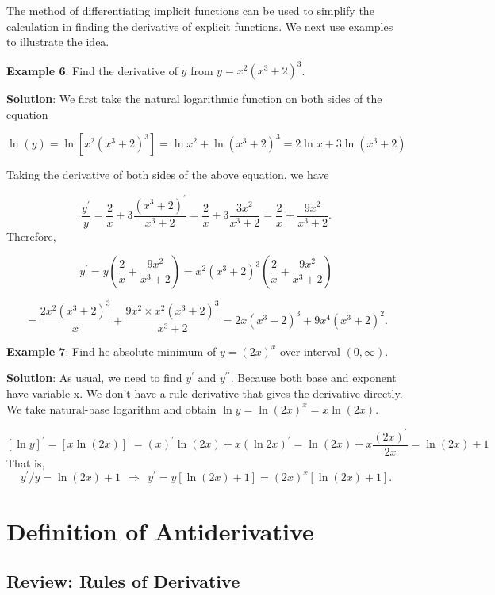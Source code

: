 \documentclass[
]{book}
\begin{document}
The method of differentiating implicit functions can be used to simplify the calculation in finding the derivative of explicit functions. We next use examples to illustrate the idea.

\hfill\break

\textbf{Example 6}: Find the derivative of \(y\) from \(y = x^2(x^3+2)^3\).

\textbf{Solution}: We first take the natural logarithmic function on both sides of the equation

\[
\ln (y) = \ln[x^2(x^3+2)^3] = \ln x^2 + \ln (x^3 + 2)^3 = 2\ln x + 3\ln  (x^3 + 2)
\]

Taking the derivative of both sides of the above equation, we have

\[
\frac{y^\prime}{y} = \frac{2}{x} + 3\frac{(x^3+2)^\prime}{x^3+2} = \frac{2}{x} + 3\frac{3x^2}{x^3+2} = \frac{2}{x} + \frac{9x^2}{x^3+2}.
\]
Therefore,

\[
y^\prime = y\left( \frac{2}{x} + \frac{9x^2}{x^3+2}\right) = x^2(x^3+2)^3 \left( \frac{2}{x} + \frac{9x^2}{x^3+2}\right) 
\]

\[
=  \frac{2x^2(x^3+2)^3}{x} + \frac{9x^2\times x^2(x^3+2)^3}{x^3+2}= 2x(x^3+2)^3 + 9x^4(x^3+2)^2.
\]

\hfill\break

\textbf{Example 7}: Find he absolute minimum of \(y = (2x)^x\) over interval \((0, \infty)\).

\textbf{Solution}: As usual, we need to find \(y^\prime\) and \(y^{\prime\prime}\). Because both base and exponent have variable x. We don't have a rule derivative that gives the derivative directly. We take natural-base logarithm and obtain \(\ln y = \ln (2x)^x = x\ln(2x)\).

\[
[\ln y]^\prime = [x\ln(2x)]^\prime = (x)^\prime \ln(2x) + x(\ln 2x)^\prime = \ln(2x) + x\frac{(2x)^\prime}{2x}  = \ln(2x) + 1
\]
That is,
\[
y^\prime / y=\ln(2x) + 1~~\Rightarrow~~ y^\prime = y[\ln(2x)+1] = (2x)^x[\ln(2x) + 1].
\]

\hypertarget{definition-of-antiderivative}{%
\chapter{Definition of Antiderivative}\label{definition-of-antiderivative}}

\hypertarget{review-rules-of-derivative}{%
\section{Review: Rules of Derivative}\label{review-rules-of-derivative}}
\end{document}
